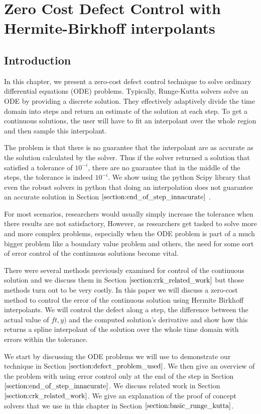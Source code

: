 \documentclass{article}
\begin{document}
\section{Zero Cost Defect Control with Hermite-Birkhoff interpolants}
\subsection{Introduction}
In this chapter, we present a zero-cost defect control technique to solve ordinary differential equations (ODE) problems. Typically, Runge-Kutta solvers solve an ODE by providing a discrete solution. They effectively adaptively divide the time domain into steps and return an estimate of the solution at each step. To get a continuous solutions, the user will have to fit an interpolant over the whole region and then sample this interpolant. 

The problem is that there is no guarantee that the interpolant are as accurate as the solution calculated by the solver. Thus if the solver returned a solution that satisfied a tolerance of $10^{-i}$, there are no guarantee that in the middle of the steps, the tolerance is indeed $10^{-i}$. We show using the python Scipy library that even the robust solvers in python that doing an interpolation does not guarantee an accurate solution in Section $\ref{section:end_of_step_innacurate}$ . 

For most scenarios, researchers would usually simply increase the tolerance when there results are not satisfactory,  However, as researchers get tasked to solve more and more complex problems, especially when the ODE problem is part of a much bigger problem like a boundary value problem and others, the need for some sort of error control of the continuous solutions become vital.

There were several methods previously examined for control of the continuous solution and we discuss them in Section $\ref{section:crk_related_work}$ but those methods turn out to be very costly. In this paper we will discuss a zero-cost method to control the error of the continuous solution using Hermite Birkhoff interpolants. We will control the defect along a step, the difference between the actual value of $ft, y)$ and the computed solution's derivative and show how this returns a spline interpolant of the solution over the whole time domain with errors within the tolerance.

We start by discussing the ODE problems we will use to demonstrate our technique in Section $\ref{section:defect_problem_used}$. We then give an overview of the problem with using error control only at the end of the step in Section $\ref{section:end_of_step_innacurate}$. We discuss related work in Section $\ref{section:crk_related_work}$. We give an explanation of the proof of concept solvers that we use in this chapter in Section $\ref{section:basic_runge_kutta}$. 
\end{document}
